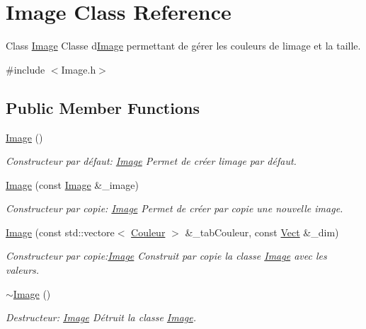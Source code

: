 \hypertarget{classImage}{}\section{Image Class Reference}
\label{classImage}


Class \hyperlink{classImage}{Image} Classe d\textquotesingle{}\hyperlink{classImage}{Image} permettant de gérer les couleurs de l\textquotesingle{}image et la taille.  




{\ttfamily \#include $<$Image.\+h$>$}

\subsection*{Public Member Functions}
\begin{DoxyCompactItemize}
\item 
\hyperlink{classImage_a58edd1c45b4faeb5f789b0d036d02313}{Image} ()
\begin{DoxyCompactList}\small\item\em Constructeur par défaut\+: \hyperlink{classImage}{Image} Permet de créer l\textquotesingle{}image par défaut. \end{DoxyCompactList}\item 
\hyperlink{classImage_a18dba28d7d81f51cabf37e0044bd2d6c}{Image} (const \hyperlink{classImage}{Image} \&\+\_\+image)
\begin{DoxyCompactList}\small\item\em Constructeur par copie\+: \hyperlink{classImage}{Image} Permet de créer par copie une nouvelle image. \end{DoxyCompactList}\item 
\hyperlink{classImage_ae8b4bc2d9cf6b0591f9c16829e0b1dad}{Image} (const std\+::vectore$<$ \hyperlink{classCouleur}{Couleur} $>$ \&\+\_\+tab\+Couleur, const \hyperlink{classVect}{Vect} \&\+\_\+dim)
\begin{DoxyCompactList}\small\item\em Constructeur par copie\+:\hyperlink{classImage}{Image} Construit par copie la classe \hyperlink{classImage}{Image} avec les valeurs. \end{DoxyCompactList}\item 
\mbox{\label{classImage_a0294f63700543e11c0f0da85601c7ae5}} 
\hyperlink{classImage_a0294f63700543e11c0f0da85601c7ae5}{$\sim$\+Image} ()
\begin{DoxyCompactList}\small\item\em Destructeur\+: \hyperlink{classImage}{Image} Détruit la classe \hyperlink{classImage}{Image}. \end{DoxyCompactList}\item 

\end{DoxyCompactItemize}
